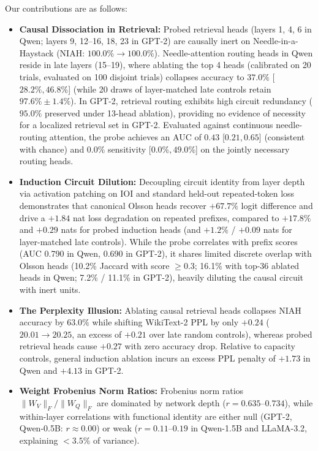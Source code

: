 \documentclass[11pt]{article}
\begin{document}
Our contributions are as follows:
\begin{itemize}
    \setlength{\itemsep}{1pt}
    \item \textbf{Causal Dissociation in Retrieval:} Probed retrieval heads (layers 1, 4, 6 in Qwen; layers 9, 12--16, 18, 23 in GPT-2) are causally inert on Needle-in-a-Haystack (NIAH: $100.0\% \to 100.0\%$). Needle-attention routing heads in Qwen reside in late layers (15--19), where ablating the top 4 heads (calibrated on 20 trials, evaluated on 100 disjoint trials) collapses accuracy to $37.0\%$ [$28.2\%, 46.8\%$] (while 20 draws of layer-matched late controls retain $97.6\% \pm 1.4\%$). In GPT-2, retrieval routing exhibits high circuit redundancy ($95.0\%$ preserved under 13-head ablation), providing no evidence of necessity for a localized retrieval set in GPT-2. Evaluated against continuous needle-routing attention, the probe achieves an AUC of $0.43$ [$0.21, 0.65$] (consistent with chance) and $0.0\%$ sensitivity [$0.0\%, 49.0\%$] on the jointly necessary routing heads.
    \item \textbf{Induction Circuit Dilution:} Decoupling circuit identity from layer depth via activation patching on IOI and standard held-out repeated-token loss demonstrates that canonical Olsson heads recover $+67.7\%$ logit difference and drive a $+1.84$ nat loss degradation on repeated prefixes, compared to $+17.8\%$ and $+0.29$ nats for probed induction heads (and $+1.2\%$ / $+0.09$ nats for layer-matched late controls). While the probe correlates with prefix scores (AUC 0.790 in Qwen, 0.690 in GPT-2), it shares limited discrete overlap with Olsson heads (10.2\% Jaccard with score $\ge 0.3$; 16.1\% with top-36 ablated heads in Qwen; 7.2\% / 11.1\% in GPT-2), heavily diluting the causal circuit with inert units.
    \item \textbf{The Perplexity Illusion:} Ablating causal retrieval heads collapses NIAH accuracy by $63.0\%$ while shifting WikiText-2 PPL by only $+0.24$ ($20.01 \to 20.25$, an excess of $+0.21$ over late random controls), whereas probed retrieval heads cause $+0.27$ with zero accuracy drop. Relative to capacity controls, general induction ablation incurs an excess PPL penalty of $+1.73$ in Qwen and $+4.13$ in GPT-2.
    \item \textbf{Weight Frobenius Norm Ratios:} Frobenius norm ratios $\|W_V\|_F / \|W_Q\|_F$ are dominated by network depth ($r = 0.635\text{--}0.734$), while within-layer correlations with functional identity are either null (GPT-2, Qwen-0.5B: $r \approx 0.00$) or weak ($r = 0.11\text{--}0.19$ in Qwen-1.5B and LLaMA-3.2, explaining $<3.5\%$ of variance).

\end{itemize}
\end{document}
